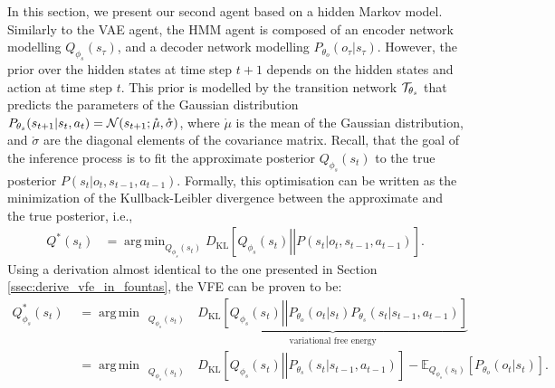 \documentclass[twoside,11pt]{article}
\let\oldmathcal\mathcal
\renewcommand{\mathcal}[1]{%
  \IfSubStr{ABCDEFGHIJKLMNOPQRSTUVWXYZ}{#1}{\oldmathcal{#1}}{\mathdutchcal{#1}}
}
\newcommand{\kl}[2]{D_{\mathrm{KL}} \left[ \left. \left. #1 \right|\right| #2 \right] }
\DeclareMathOperator*{\argmin}{arg\,min}
\begin{document}
In this section, we present our second agent based on a hidden Markov model. Similarly to the VAE agent, the HMM agent is composed of an encoder network modelling $Q_{\phi_s}(s_\tau)$, and a decoder network modelling $P_{\theta_o}(o_\tau|s_\tau)$. However, the prior over the hidden states at time step $t+1$ depends on the hidden states and action at time step $t$. This prior is modelled by the transition network $\mathcal{T}_{\theta_s}$ that predicts the parameters of the Gaussian distribution $P_{\theta_s}(s_{t+1}|s_t,a_t) = \mathcal{N}(s_{t+1}; \mathring{\mu}, \mathring{\sigma})$, where $\mathring{\mu}$ is the mean of the Gaussian distribution, and $\mathring{\sigma}$ are the diagonal elements of the covariance matrix. Recall, that the goal of the inference process is to fit the approximate posterior $Q_{\phi_s}(s_t)$ to the true posterior $P(s_t|o_t, s_{t-1}, a_{t-1})$. Formally, this optimisation can be written as the minimization of the Kullback-Leibler divergence between the approximate and the true posterior, i.e.,
\begin{align*}
Q^*(s_t) &= \argmin_{Q_{\phi_s}(s_t)} \kl{Q_{\phi_s}(s_t)}{P(s_t|o_t, s_{t-1}, a_{t-1})}.
\end{align*}
Using a derivation almost identical to the one presented in Section \ref{ssec:derive_vfe_in_fountas}, the VFE can be proven to be:
\begin{align}
Q^*_{\phi_s}(s_t)\,\, &= \argmin_{\quad Q_{\phi_s}(s_t) \quad }\underbrace{\kl{Q_{\phi_s}(s_t)}{P_{\theta_o}(o_t|s_t)P_{\theta_s}(s_t|s_{t-1},a_{t-1})}}_{\text{variational free energy}}\label{eq:vfe_defi}\\
&= \argmin_{\quad Q_{\phi_s}(s_t)\quad } \kl{Q_{\phi_s}(s_t)}{P_{\theta_s}(s_t|s_{t-1},a_{t-1})} - \mathbb{E}_{Q_{\phi_s}(s_t)}[P_{\theta_o}(o_t|s_t)].\nonumber
\end{align}
\end{document}
